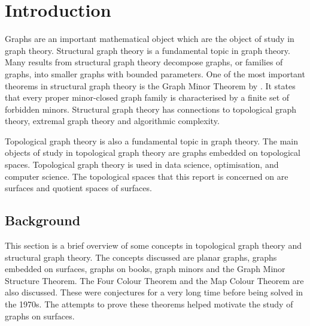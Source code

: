 \chapter{Introduction}\label{sec:introduction}
Graphs are an important mathematical object which are the object of study in graph theory. 
Structural graph theory is a fundamental topic in graph theory. Many results from structural graph theory decompose graphs, or families of graphs, into smaller graphs with bounded parameters. One of the most important theorems in structural graph theory is the Graph Minor Theorem by \textcite{robertsonGraphMinorsXX2004}. It states that every proper minor-closed graph family is characterised by a finite set of forbidden minors. Structural graph theory has connections to topological graph theory, extremal graph theory and algorithmic complexity. 

Topological graph theory is also a fundamental topic in graph theory. The main objects of study in topological graph theory are graphs embedded on topological spaces. Topological graph theory is used in data science, optimisation, and computer science. The topological spaces that this report is concerned on are surfaces and quotient spaces of surfaces. 





\newpage
\section{Background}\label{sec:background}
This section is a brief overview of some concepts in topological graph theory and structural graph theory. The concepts discussed are planar graphs, graphs embedded on surfaces, graphs on books, graph minors and the Graph Minor Structure Theorem. The Four Colour Theorem and the Map Colour Theorem are also discussed. These were conjectures for a very long time before being solved in the 1970s. The attempts to prove these theorems helped motivate the study of graphs on surfaces.
%

%

%



